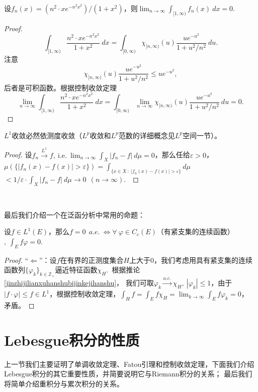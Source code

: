 \documentclass[color=green,thmcnt=section,lang=cn,12pt]{elegantbook}
\numberwithin{equation}{section}%
\numberwithin{figure}{section}%
\newcommand{\ZZ}{\mathbb{Z}}
\newcommand{\ee}{\varepsilon}
\newcommand{\any}{\forall \ }
\newcommand{\csf}[1]{\{#1_k\}_{k\in \ZZ_+}} %
\begin{document}
\begin{example}
        设$f_n(x)=(n^2\cdot xe^{-n^2x^2})/(1+x^2)$，则$\lim_{n\to\infty}\int_{[1,\infty)}f_n(x)\ dx=0$.\ 
\end{example}
\begin{proof}
    $$\int_{[1,\infty)}\frac{n^2\cdot xe^{-n^2x^2}}{1+x^2}\ dx=\int_{[0,\infty)}\chi_{[n,\infty)}(u)\frac{ue^{-u^2}}{1+u^2/n^2}\ du.$$注意$$\chi_{[n,\infty)}(u)\frac{ue^{-u^2}}{1+u^2/n^2}\leq ue^{-u^2},$$
    后者是可积函数。根据控制收敛定理\begin{equation*}
        \lim_{n\to\infty}\int_{[1,\infty)}\frac{n^2\cdot xe^{-n^2x^2}}{1+x^2}\ dx=\int_{[0,\infty)}\lim_{n\to\infty}\chi_{[n,\infty)}(u)\frac{ue^{-u^2}}{1+u^2/n^2}\ du=0.
    \end{equation*}
\end{proof}

\begin{proposition}
    $L^1$收敛必然依测度收敛（$L^p$收敛和$L^p$范数的详细概念见$L^p$空间一节）。
\end{proposition}
\begin{proof}
    设$f_n\xrightarrow{L^1}f,\ \textrm{i.e.}\ \lim_{n\to\infty}\int_X|f_n-f|\ d\mu=0$，那么任给$\ee>0$，$\mu(\{|f_n(x)-f(x)|>\ee\})=\int_{\{x\in X\ :\ |f_n(x)-f(x)|>\ee\}}d\mu$
    $<1/\ee\cdot \int_X|f_n-f|\ d\mu\to 0\ \ (n\to\infty)$.\ 
\end{proof}
\ 


最后我们介绍一个在泛函分析中常用的命题：
\begin{proposition}
    设$f\in L^1(E)$，那么$f=0\ \ a.e.\ \Longleftrightarrow \any \varphi\in C_c(E)$（有紧支集的连续函数）$,\ \int_Ef\varphi=0.\ $
\end{proposition}
\begin{proof}
    ``$\Longleftarrow$''：设$f$在有界的正测度集合$H$上大于0，我们考虑用具有紧支集的连续函数列$\csf{\varphi}$逼近特征函数$\chi_H$.\ 根据推论\ref{jinzhijilianxuhanshubijinkejihanshu}，
    我们可取$\varphi_k\xrightarrow{a.e.}\chi_H,\ |\varphi_k|\leq 1$，由于$|f\cdot \varphi|\leq f\in L^1$，根据控制收敛定理，$\int_Hf=\int_Ef\chi_H=\lim_{k\to\infty}\int_Ef\varphi_k=0$，
    矛盾。
\end{proof}

\newpage\section{Lebesgue积分的性质}
上一节我们主要证明了单调收敛定理、Fatou引理和控制收敛定理，下面我们介绍Lebesgue积分的其它重要性质，并简要说明它与Riemann积分的关系；
最后我们将简单介绍重积分与累次积分的关系。
\end{document}
